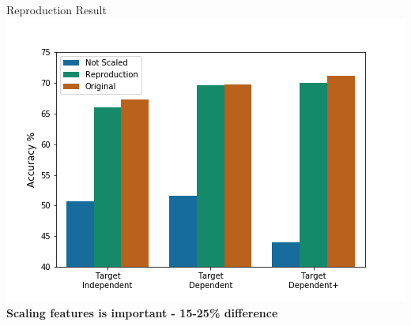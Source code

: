 \documentclass[10pt]{beamer}
\begin{document}
\begin{frame}{\textcite{vo_2015} Reproduction Result}
\centering
    \includegraphics[scale=0.55]{Target_Results.png}
    \\\textbf{Scaling features is important - 15-25\% difference}
\end{frame}

    
	
	
	
	
\end{document}
